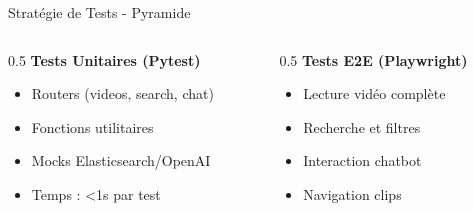 \documentclass[11pt]{beamer}
\begin{document}
\begin{frame}{Stratégie de Tests - Pyramide}
\begin{center}
\end{center}

\vspace{0.3cm}

\begin{columns}
\begin{column}{0.5\textwidth}
\textbf{Tests Unitaires (Pytest)}
\begin{itemize}
    \item Routers (videos, search, chat)
    \item Fonctions utilitaires
    \item Mocks Elasticsearch/OpenAI
    \item Temps : \textless 1s par test
\end{itemize}
\end{column}

\begin{column}{0.5\textwidth}
\textbf{Tests E2E (Playwright)}
\begin{itemize}
    \item Lecture vidéo complète
    \item Recherche et filtres
    \item Interaction chatbot
    \item Navigation clips
\end{itemize}
\end{column}
\end{columns}
\end{frame}
\end{document}
